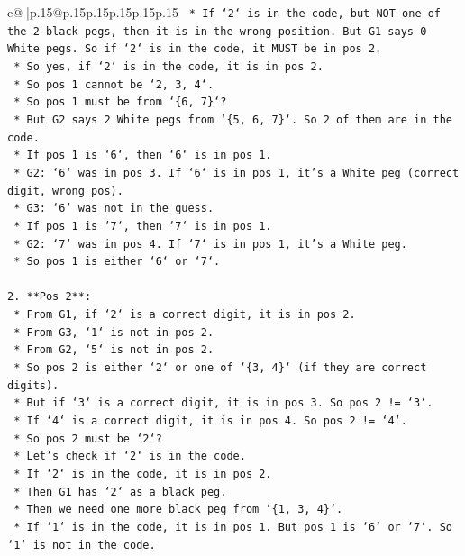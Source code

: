 \documentclass{article}
\begin{document}
{\begin{supertabular}{c@{$\;$}|p{.15\linewidth}@{}p{.15\linewidth}p{.15\linewidth}p{.15\linewidth}p{.15\linewidth}p{.15\linewidth}}
{{{\texttt{        *   If `2` is in the code, but NOT one of the 2 black pegs, then it is in the wrong position. But G1 says 0 White pegs. So if `2` is in the code, it MUST be in pos 2.} \\
\texttt{        *   So yes, if `2` is in the code, it is in pos 2.} \\
\texttt{    *   So pos 1 cannot be `2, 3, 4`.} \\
\texttt{    *   So pos 1 must be from `\{6, 7\}`?} \\
\texttt{    *   But G2 says 2 White pegs from `\{5, 6, 7\}`. So 2 of them are in the code.} \\
\texttt{    *   If pos 1 is `6`, then `6` is in pos 1.} \\
\texttt{        *   G2: `6` was in pos 3. If `6` is in pos 1, it's a White peg (correct digit, wrong pos).} \\
\texttt{        *   G3: `6` was not in the guess.} \\
\texttt{    *   If pos 1 is `7`, then `7` is in pos 1.} \\
\texttt{        *   G2: `7` was in pos 4. If `7` is in pos 1, it's a White peg.} \\
\texttt{    *   So pos 1 is either `6` or `7`.} \\
\\ 
\texttt{2.  **Pos 2**:} \\
\texttt{    *   From G1, if `2` is a correct digit, it is in pos 2.} \\
\texttt{    *   From G3, `1` is not in pos 2.} \\
\texttt{    *   From G2, `5` is not in pos 2.} \\
\texttt{    *   So pos 2 is either `2` or one of `\{3, 4\}` (if they are correct digits).} \\
\texttt{    *   But if `3` is a correct digit, it is in pos 3. So pos 2 != `3`.} \\
\texttt{    *   If `4` is a correct digit, it is in pos 4. So pos 2 != `4`.} \\
\texttt{    *   So pos 2 must be `2`?} \\
\texttt{    *   Let's check if `2` is in the code.} \\
\texttt{        *   If `2` is in the code, it is in pos 2.} \\
\texttt{        *   Then G1 has `2` as a black peg.} \\
\texttt{        *   Then we need one more black peg from `\{1, 3, 4\}`.} \\
\texttt{        *   If `1` is in the code, it is in pos 1. But pos 1 is `6` or `7`. So `1` is not in the code.} \\
}}}
\end{supertabular}}
\end{document}
